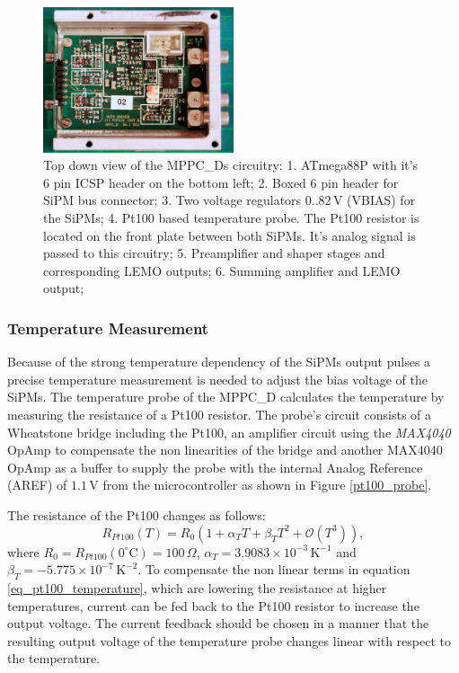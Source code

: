 	\begin{figure}[t]
		\centering
			\includegraphics[width=0.5\textwidth]{Figures/weinstock/mppc_d_titled.png}
		\caption{Top down view of the MPPC\_Ds circuitry: 1. ATmega88P with it's 6 pin ICSP header on the bottom left; 
								  2. Boxed 6 pin header for SiPM bus connector;
								  3. Two voltage regulators $0..82\,\text{V}$ (VBIAS) for the SiPMs;
								  4. Pt100 based temperature probe. The Pt100 resistor is located on the front plate between both SiPMs. 
								       It's analog signal is passed to this circuitry;
								  5. Preamplifier and shaper stages and corresponding LEMO outputs; 
								  6. Summing amplifier and LEMO output;
			}
		\label{mppc_top}
	\end{figure}	

\newpage

\subsubsection{Temperature Measurement}

Because of the strong temperature dependency of the SiPMs output pulses a precise temperature measurement is needed to adjust the bias voltage of the SiPMs. The temperature probe of
the MPPC\_D calculates the temperature by measuring the resistance of a Pt100 resistor. The probe's circuit consists of a Wheatstone bridge including the Pt100, an amplifier circuit using
the \emph{MAX4040} OpAmp to compensate the non linearities of the bridge and another MAX4040 OpAmp as a buffer to supply the probe with the
internal Analog Reference (AREF) of $1.1\,\text{V}$ from the microcontroller as shown in Figure \ref{pt100_probe}.

The resistance of the Pt100 changes as follows:
	\begin{equation}
		R_{Pt100}(T) = R_0(1 +\alpha_T T + \beta_T T^2 + \mathcal{O}(T^3)),
		\label{eq_pt100_temperature}
	\end{equation}
where $R_0 = R_{Pt100}(0^{\circ} \text{C})=100\,\Omega$, $\alpha_T = 3.9083 \times 10^{-3}\, \text{K}^{-1}$ and $\beta_T = -5.775 \times 10^{-7}\, \text{K}^{-2}$. To compensate 
the non linear terms in equation \ref{eq_pt100_temperature}, which are lowering the resistance at higher temperatures, current can be fed back to the Pt100 resistor to increase 
the output voltage. The current feedback should be chosen in a manner that the resulting output voltage of the temperature probe changes linear with respect to the temperature.

